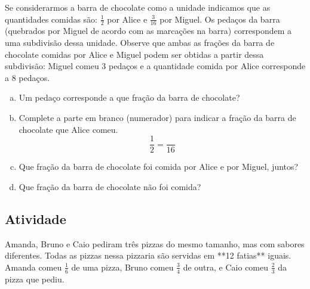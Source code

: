 Se considerarmos a barra de chocolate como a unidade indicamos que as quantidades comidas são: $\frac{1}{2}$ por Alice e $\frac{3}{16}$ por Miguel.
Os pedaços da barra (quebrados por Miguel de acordo com as marcações na barra) correspondem a uma subdivisão dessa unidade.
Observe que ambas as frações da barra de chocolate comidas por Alice e Miguel podem ser obtidas a partir dessa subdivisão: Miguel comeu 3 pedaços e a quantidade comida por Alice corresponde a 8 pedaços.
\begin{enumerate}[a)]
\item Um pedaço corresponde a que fração da barra de chocolate?
\item Complete a parte em branco (numerador) para indicar a fração da barra de chocolate que Alice comeu. $$\frac{1}{2} = \frac{ }{16}$$ 
\item Que fração da barra de chocolate foi comida por Alice e por Miguel, juntos?
\item  Que fração da barra de chocolate não foi comida?
\end{enumerate}

\subsection{Atividade}


Amanda, Bruno e Caio pediram três pizzas do mesmo tamanho, mas com sabores diferentes. Todas as pizzas nessa pizzaria são servidas em **12 fatias** iguais. Amanda comeu $\frac{1}{6}$ de uma pizza, Bruno comeu $\frac{3}{4}$ de outra, e Caio comeu $\frac{2}{3}$ da pizza que pediu.

